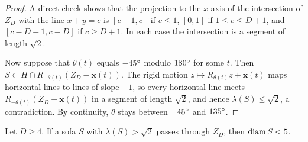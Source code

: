 \begin{proof}
A direct check shows that the projection to the $x$-axis of the intersection of $Z_D$ with the line $x+y=c$ is $[c-1,c]$ if $c\le1$, $[0,1]$ if $1\le c\le D+1$, and $[c-D-1,c-D]$ if $c\ge D+1$. In each case the intersection is a segment of length $\sqrt2$.

Now suppose that $\theta(t)$ equals $-45^{\circ}$ modulo $180^{\circ}$ for some $t$. Then $S\subset H\cap R_{-\theta(t)}(Z_D-\mathbf{x}(t))$. The rigid motion $z\mapsto R_{\theta(t)}z+\mathbf{x}(t)$ maps horizontal lines to lines of slope $-1$, so every horizontal line meets $R_{-\theta(t)}(Z_D-\mathbf{x}(t))$ in a segment of length $\sqrt2$, and hence $\lambda(S)\le\sqrt2$, a contradiction. By continuity, $\theta$ stays between $-45^{\circ}$ and $135^{\circ}$.
\end{proof}

\begin{lem}\label{lem:diameter}
Let $D\ge4$. If a sofa $S$ with $\lambda(S)>\sqrt2$ passes through $Z_D$, then $\operatorname{diam} S<5$.
\end{lem}

